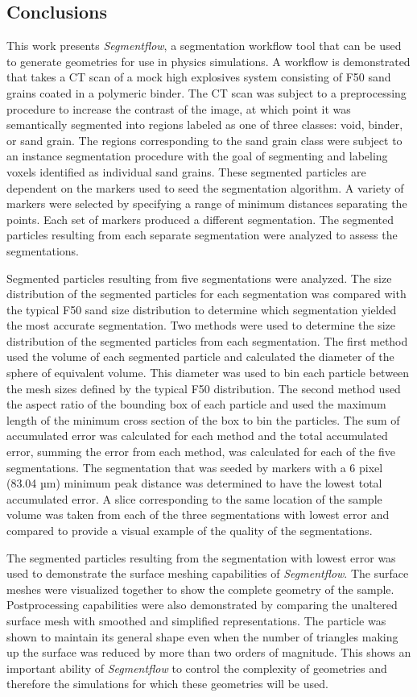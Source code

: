 \subsection{Conclusions}
This work presents \textit{Segmentflow}, a segmentation workflow tool
that can be used to generate geometries for use in physics simulations.
A workflow is demonstrated that takes a CT scan of a mock high explosives
system consisting of F50 sand grains coated in a polymeric binder.
The CT scan was subject to a preprocessing procedure to increase the
contrast of the image, at which point it was semantically segmented
into regions labeled as one of three classes: void, binder, or sand grain.
The regions corresponding to the sand grain class were subject to an
instance segmentation procedure with the goal of segmenting and labeling
voxels identified as individual sand grains. These segmented particles are
dependent on the markers used to seed the segmentation algorithm.
A variety of markers were selected by specifying a range of minimum
distances separating the points. Each set of markers produced a different
segmentation. The segmented particles resulting from each separate
segmentation were analyzed to assess the segmentations.

Segmented particles resulting from five segmentations were analyzed.
The size distribution of the segmented particles
for each segmentation was compared with the typical F50 sand size
distribution to determine which segmentation yielded the most
accurate segmentation. Two methods were used to determine the size
distribution of the segmented particles from each segmentation. The first
method used the volume of each segmented particle and calculated the diameter
of the sphere of equivalent volume. This diameter was used to bin each
particle between the mesh sizes defined by the typical F50 distribution.
The second method used the aspect ratio of the bounding box of each particle
and used the maximum length of the minimum cross section of the box to bin
the particles. The sum of accumulated error was calculated for each method
and the total accumulated error, summing the error from each method,
was calculated for each of the five segmentations. The segmentation that
was seeded by markers with a 6 pixel (83.04 µm) minimum peak distance was
determined to have the lowest total accumulated error. A slice corresponding
to the same location of the sample volume was taken from each of the
three segmentations with lowest error and compared to provide a visual
example of the quality of the segmentations.

The segmented particles resulting from the segmentation with lowest error
was used to demonstrate the surface meshing capabilities of
\textit{Segmentflow}. The surface meshes were visualized together to show
the complete geometry of the sample. Postprocessing capabilities were also
demonstrated by comparing the unaltered surface mesh with smoothed and
simplified representations. The particle was shown to maintain its
general shape even when the number of triangles making up the surface
was reduced by more than two orders of magnitude. This shows an important
ability of \textit{Segmentflow} to control the complexity of geometries
and therefore the simulations for which these geometries will be used.

